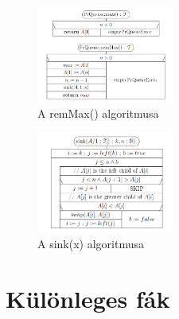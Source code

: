 \documentclass[margin=0px]{article}
\begin{document}
\begin{figure}[H]
    \centering
    \includegraphics[width=0.4\textwidth]{img/pr_max.png}
    \caption{A remMax() algoritmusa}
\end{figure}

\begin{figure}[H]
    \centering
    \includegraphics[width=0.4\textwidth]{img/pr_sink.png}
    \caption{A sink(x) algoritmusa}
\end{figure}

\section{Különleges fák}
\end{document}
